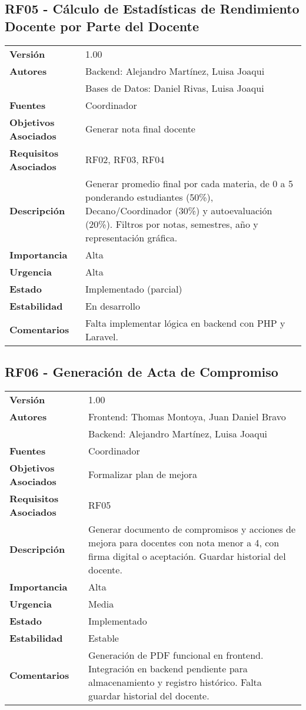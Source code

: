 \documentclass{article}
\begin{document}
\subsection*{RF05 - Cálculo de Estadísticas de Rendimiento Docente por Parte del Docente}
\begin{longtable}{>{\bfseries}l p{}}
Versión & 1.00 \\
Autores & Backend: Alejandro Martínez, Luisa Joaqui \\ 
        & Bases de Datos: Daniel Rivas, Luisa Joaqui \\
Fuentes & Coordinador \\
Objetivos Asociados & Generar nota final docente \\
Requisitos Asociados & RF02, RF03, RF04 \\
Descripción & Generar promedio final por cada materia, de 0 a 5 ponderando estudiantes (50\%), Decano/Coordinador (30\%) y autoevaluación (20\%). Filtros por notas, semestres, año y representación gráfica. \\
Importancia & Alta \\
Urgencia & Alta \\
Estado & Implementado (parcial) \\
Estabilidad & En desarrollo \\
Comentarios & Falta implementar lógica en backend con PHP y Laravel. \\
\end{longtable}

\subsection*{RF06 - Generación de Acta de Compromiso}
\begin{longtable}{>{\bfseries}l p{}}
Versión & 1.00 \\
Autores & Frontend: Thomas Montoya, Juan Daniel Bravo \\ 
        & Backend: Alejandro Martínez, Luisa Joaqui \\
Fuentes & Coordinador \\
Objetivos Asociados & Formalizar plan de mejora \\
Requisitos Asociados & RF05 \\
Descripción & Generar documento de compromisos y acciones de mejora para docentes con nota menor a 4, con firma digital o aceptación. Guardar historial del docente. \\
Importancia & Alta \\
Urgencia & Media \\
Estado & Implementado \\
Estabilidad & Estable \\
Comentarios & Generación de PDF funcional en frontend. Integración en backend pendiente para almacenamiento y registro histórico. Falta guardar historial del docente. \\
\end{longtable}
\end{document}
